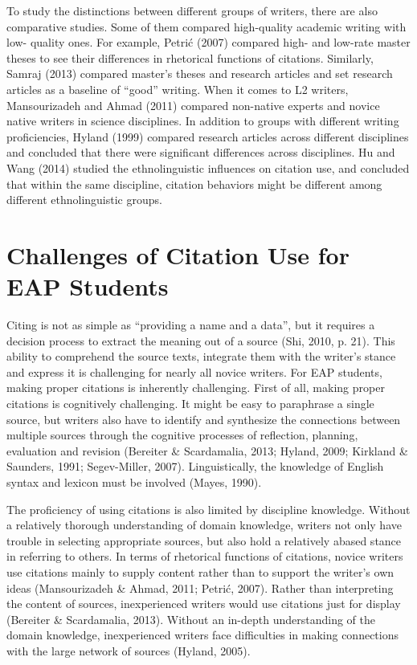 To study the distinctions between different groups of writers, there are also comparative studies. Some of them compared high-quality academic writing with low- quality ones. For example, Petrić (2007) compared high- and low-rate master theses to see their differences in rhetorical functions of citations. Similarly, Samraj (2013) compared master’s theses and research articles and set research articles as a baseline of “good” writing. When it comes to L2 writers, Mansourizadeh and Ahmad (2011) compared non-native experts and novice native writers in science disciplines. In addition to groups with different writing proficiencies, Hyland (1999) compared research articles across different disciplines and concluded that there were significant differences across disciplines. Hu and Wang (2014) studied the ethnolinguistic influences on citation use, and concluded that within the same discipline, citation behaviors might be different among different ethnolinguistic groups.

\section{Challenges of Citation Use for EAP Students}
Citing is not as simple as “providing a name and a data”, but it requires a decision process to extract the meaning out of a source (Shi, 2010, p. 21). This ability to comprehend the source texts, integrate them with the writer’s stance and express it is challenging for nearly all novice writers. For EAP students, making proper citations is inherently challenging. First of all, making proper citations is cognitively challenging. It might be easy to paraphrase a single source, but writers also have to identify and synthesize the connections between multiple sources through the cognitive processes of reflection, planning, evaluation and revision (Bereiter \& Scardamalia, 2013; Hyland, 2009; Kirkland \& Saunders, 1991; Segev-Miller, 2007). Linguistically, the knowledge of English syntax and lexicon must be involved (Mayes, 1990).

The proficiency of using citations is also limited by discipline knowledge. Without a relatively thorough understanding of domain knowledge, writers not only have trouble in selecting appropriate sources, but also hold a relatively abased stance in referring to others. In terms of rhetorical functions of citations, novice writers use citations mainly to supply content rather than to support the writer’s own ideas (Mansourizadeh \& Ahmad, 2011; Petrić, 2007). Rather than interpreting the content of sources, inexperienced writers would use citations just for display (Bereiter \& Scardamalia, 2013). Without an in-depth understanding of the domain knowledge, inexperienced writers face difficulties in making connections with the large network of sources (Hyland, 2005).

